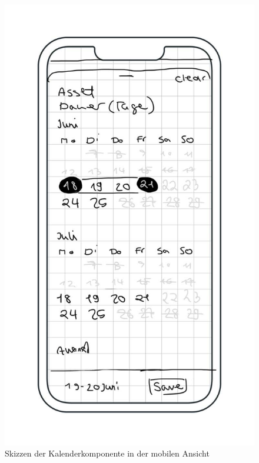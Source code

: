 \begin{figure}[h]
    \centering
    \includegraphics[scale=0.33]{Bilder/Mockups/Kalender.jpg}\hspace{2em}
    \caption{Skizzen der Kalenderkomponente in der mobilen Ansicht}
    \label{fig:kalender}
\end{figure}
